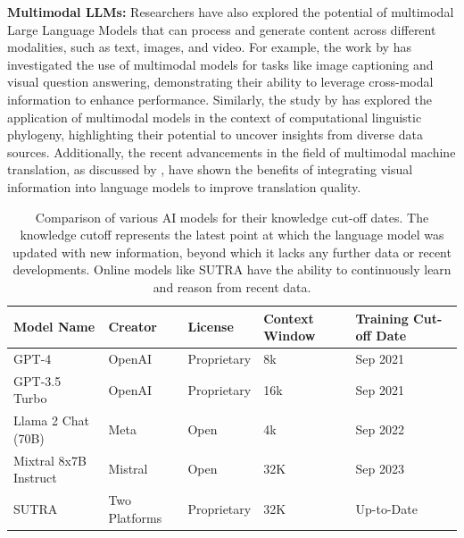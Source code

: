 \documentclass{article}
\begin{document}
\textbf{Multimodal LLMs:} Researchers have also explored the potential of multimodal Large Language Models that can process and generate content across different modalities, such as text, images, and video. For example, the work by \citet{dai2019transformer} has investigated the use of multimodal models for tasks like image captioning and visual question answering, demonstrating their ability to leverage cross-modal information to enhance performance. Similarly, the study by \citet{nichols2008tutorial} has explored the application of multimodal models in the context of computational linguistic phylogeny, highlighting their potential to uncover insights from diverse data sources. Additionally, the recent advancements in the field of multimodal machine translation, as discussed by \citet{birch2021neural}, have shown the benefits of integrating visual information into language models to improve translation quality.

\begin{table}[ht]
\setlength{\abovecaptionskip}{10pt} %
\setlength{\belowcaptionskip}{5pt} %
\centering
\begin{tabular}{lllll}
\toprule
\textbf{Model Name}   & \textbf{Creator}     & \textbf{License}   & \textbf{Context Window} & \textbf{Training Cut-off Date} \\ \midrule
GPT-4                 & OpenAI               & Proprietary        & 8k                      & Sep 2021                      \\
GPT-3.5 Turbo         & OpenAI               & Proprietary        & 16k                     & Sep 2021                      \\
Llama 2 Chat (70B)    & Meta                 & Open               & 4k                      & Sep 2022                      \\
Mixtral 8x7B Instruct & Mistral              & Open               & 32K                     & Sep 2023                      \\
SUTRA                 & Two Platforms        & Proprietary        & 32K                     & Up-to-Date                    \\ \bottomrule
\end{tabular}
\caption{Comparison of various AI models for their knowledge cut-off dates. The knowledge cutoff represents the latest point at which the language model was updated with new information, beyond which it lacks any further data or recent developments. Online models like SUTRA have the ability to continuously learn and reason from recent data.}
\label{table:ai_models}
\end{table}
\end{document}
